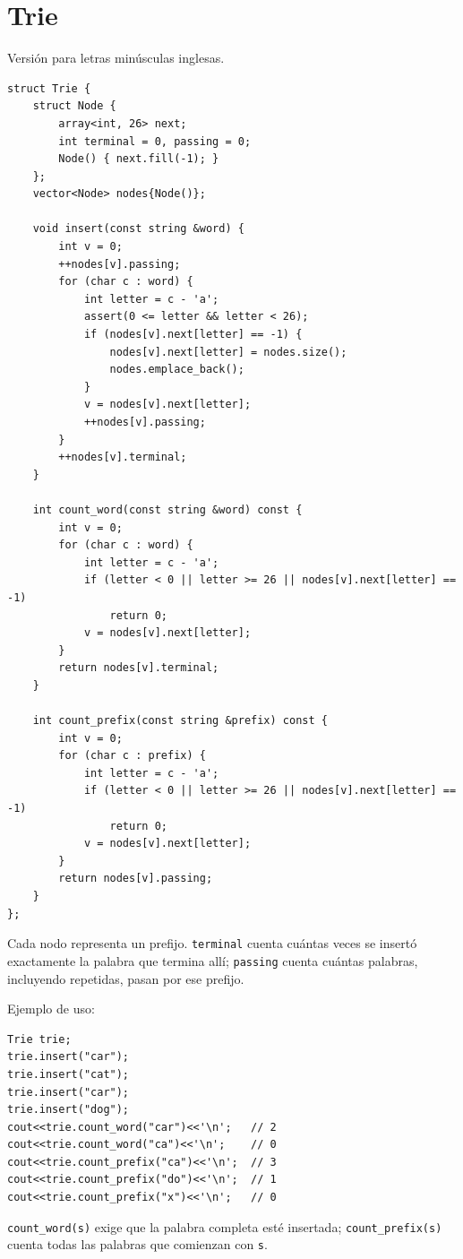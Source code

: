 \section{Trie}
Versi\'on para letras min\'usculas inglesas.

\begin{lstlisting}[style=cpp]
struct Trie {
    struct Node {
        array<int, 26> next;
        int terminal = 0, passing = 0;
        Node() { next.fill(-1); }
    };
    vector<Node> nodes{Node()};

    void insert(const string &word) {
        int v = 0;
        ++nodes[v].passing;
        for (char c : word) {
            int letter = c - 'a';
            assert(0 <= letter && letter < 26);
            if (nodes[v].next[letter] == -1) {
                nodes[v].next[letter] = nodes.size();
                nodes.emplace_back();
            }
            v = nodes[v].next[letter];
            ++nodes[v].passing;
        }
        ++nodes[v].terminal;
    }

    int count_word(const string &word) const {
        int v = 0;
        for (char c : word) {
            int letter = c - 'a';
            if (letter < 0 || letter >= 26 || nodes[v].next[letter] == -1)
                return 0;
            v = nodes[v].next[letter];
        }
        return nodes[v].terminal;
    }

    int count_prefix(const string &prefix) const {
        int v = 0;
        for (char c : prefix) {
            int letter = c - 'a';
            if (letter < 0 || letter >= 26 || nodes[v].next[letter] == -1)
                return 0;
            v = nodes[v].next[letter];
        }
        return nodes[v].passing;
    }
};
\end{lstlisting}


Cada nodo representa un prefijo. \texttt{terminal} cuenta cuántas veces se
insertó exactamente la palabra que termina allí; \texttt{passing} cuenta
cuántas palabras, incluyendo repetidas, pasan por ese prefijo.

Ejemplo de uso:

\begin{lstlisting}[style=cpp]
Trie trie;
trie.insert("car");
trie.insert("cat");
trie.insert("car");
trie.insert("dog");
cout<<trie.count_word("car")<<'\n';   // 2
cout<<trie.count_word("ca")<<'\n';    // 0
cout<<trie.count_prefix("ca")<<'\n';  // 3
cout<<trie.count_prefix("do")<<'\n';  // 1
cout<<trie.count_prefix("x")<<'\n';   // 0
\end{lstlisting}

\texttt{count\_word(s)} exige que la palabra completa esté insertada;
\texttt{count\_prefix(s)} cuenta todas las palabras que comienzan con
\texttt{s}.
